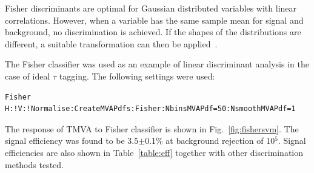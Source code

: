 \documentclass[a4paper]{jpconf}
\begin{document}
Fisher discriminants are optimal for Gaussian distributed variables
with linear correlations. 
However, when a variable has the same sample mean for signal and background, 
no discrimination is achieved. 
If the shapes of the distributions are different, 
a suitable transformation can then be applied~\cite{tmvasite}.

The Fisher classifier was used as an example of linear discriminant
analysis in the case of ideal $\tau$ tagging.  
The following settings were used:

\begin{verbatim}
Fisher H:!V:!Normalise:CreateMVAPdfs:Fisher:NbinsMVAPdf=50:NsmoothMVAPdf=1
\end{verbatim}

The response of TMVA to Fisher classifier is shown in Fig.~\ref{fig:fishersvm}. 
The signal efficiency was found to be 3.5$\pm$0.1\;\% at background rejection of 10$^5$.
Signal efficiencies are also shown in Table~\ref{table:eff} together with other 
discrimination methods tested.
 
\end{document}
